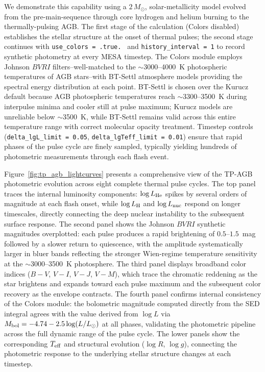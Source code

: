 \documentclass[linenumbers,apj,twocolumn, floatfix]{aastex701}
\begin{document}
We demonstrate this capability using a $2\,M_\odot$, solar-metallicity model evolved from the pre-main-sequence through core hydrogen and helium burning to the thermally-pulsing AGB.
The first stage of the calculation (Colors disabled) establishes the stellar structure at the onset of thermal pulses; the second stage continues with \texttt{use\_colors = .true.
}
and \texttt{history\_interval = 1} to record synthetic photometry at every MESA timestep.
The Colors module employs Johnson $BVRI$ filters--well-matched to the $\sim$3000--4000~K photospheric temperatures of AGB stars--with BT-Settl atmosphere models providing the spectral energy distribution at each point.
BT-Settl is chosen over the Kurucz default because AGB photospheric temperatures reach $\sim$3300--3500~K during interpulse minima and cooler still at pulse maximum; Kurucz models are unreliable below $\sim$3500~K, while BT-Settl remains valid across this entire temperature range with correct molecular opacity treatment.
Timestep controls (\texttt{delta\_lgL\_limit = 0.05}, \texttt{delta\_lgTeff\_limit = 0.01}) ensure that rapid phases of the pulse cycle are finely sampled, typically yielding hundreds of photometric measurements through each flash event.

Figure~\ref{fig:tp_agb_lightcurves} presents a comprehensive view of the TP-AGB photometric evolution across eight complete thermal pulse cycles.
The top panel traces the internal luminosity components: $\log L_{\rm He}$ spikes by several orders of magnitude at each flash onset, while $\log L_{\rm H}$ and $\log L_{\rm nuc}$ respond on longer timescales, directly connecting the deep nuclear instability to the subsequent surface response.
The second panel shows the Johnson $BVRI$ synthetic magnitudes overplotted: each pulse produces a rapid brightening of $0.5$--$1.5$~mag followed by a slower return to quiescence, with the amplitude systematically larger in bluer bands reflecting the stronger Wien-regime temperature sensitivity at the $\sim$3000--3500~K photosphere.
The third panel displays broadband color indices ($B-V$, $V-I$, $V-J$, $V-M$), which trace the chromatic reddening as the star brightens and expands toward each pulse maximum and the subsequent color recovery as the envelope contracts.
The fourth panel confirms internal consistency of the Colors module: the bolometric magnitude computed directly from the SED integral agrees with the value derived from $\log L$ via $M_{\rm bol} = -4.74 - 2.5\log(L/L_\odot)$ at all phases, validating the photometric pipeline across the full dynamic range of the pulse cycle.
The lower panels show the corresponding $T_{\rm eff}$ and structural evolution ($\log R$, $\log g$), connecting the photometric response to the underlying stellar structure changes at each timestep.
\end{document}
